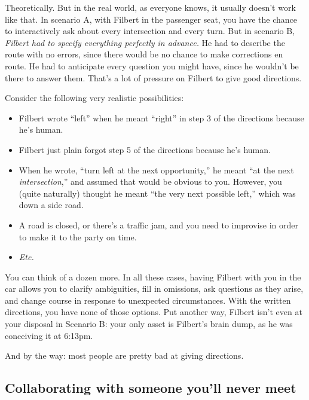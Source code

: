 Theoretically. But in the real world, as everyone knows, it usually doesn't
work like that. In scenario A, with Filbert in the passenger seat, you have the
chance to interactively ask about every intersection and every turn. But in
scenario B, \textit{Filbert had to specify everything perfectly in advance.}
He had to describe the route with no errors, since there would be no chance to
make corrections en route. He had to anticipate every question you might have,
since he wouldn't be there to answer them. That's a lot of pressure on Filbert
to give good directions.

Consider the following very realistic possibilities:

\begin{itemize}
\itemsep.1em

\item Filbert wrote ``left'' when he meant ``right'' in step 3 of the directions
because he's human.

\item Filbert just plain forgot step 5 of the directions because he's human.

\item When he wrote, ``turn left at the next opportunity,'' he meant ``at the
next \textit{intersection},'' and assumed that would be obvious to you.
However, you (quite naturally) thought he meant ``the very next possible
left,'' which was down a side road.

\item A road is closed, or there's a traffic jam, and you need to improvise
in order to make it to the party on time.

\item \textit{Etc.}

\end{itemize}

You can think of a dozen more. In all these cases, having Filbert with you in
the car allows you to clarify ambiguities, fill in omissions, ask questions as
they arise, and change course in response to unexpected circumstances. With
the written directions, you have none of those options. Put another way,
Filbert isn't even at your disposal in Scenario B: your only asset is
Filbert's brain dump, as he was conceiving it at 6:13pm.

And by the way: most people are pretty bad at giving directions.

\subsection{Collaborating with someone you'll never meet}

